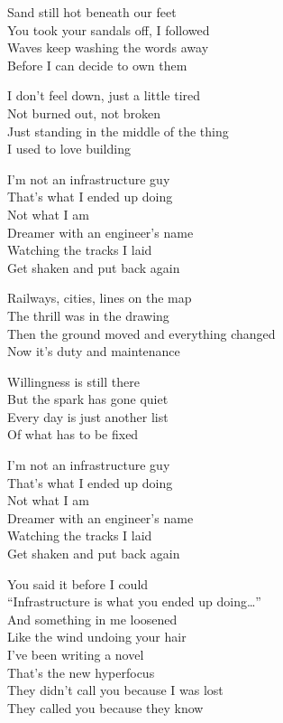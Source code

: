 \begin{lyrics}
Sand still hot beneath our feet\\
You took your sandals off, I followed\\
Waves keep washing the words away\\
Before I can decide to own them

I don’t feel down, just a little tired\\
Not burned out, not broken\\
Just standing in the middle of the thing\\
I used to love building

I’m not an infrastructure guy\\
That’s what I ended up doing\\
Not what I am\\
Dreamer with an engineer’s name\\
Watching the tracks I laid\\
Get shaken and put back again

Railways, cities, lines on the map\\
The thrill was in the drawing\\
Then the ground moved and everything changed\\
Now it’s duty and maintenance

Willingness is still there\\
But the spark has gone quiet\\
Every day is just another list\\
Of what has to be fixed

I’m not an infrastructure guy\\
That’s what I ended up doing\\
Not what I am\\
Dreamer with an engineer’s name\\
Watching the tracks I laid\\
Get shaken and put back again

You said it before I could\\
“Infrastructure is what you ended up doing…”\\
And something in me loosened\\
Like the wind undoing your hair\\
I’ve been writing a novel\\
That’s the new hyperfocus\\
They didn’t call you because I was lost\\
They called you because they know


\end{lyrics}
